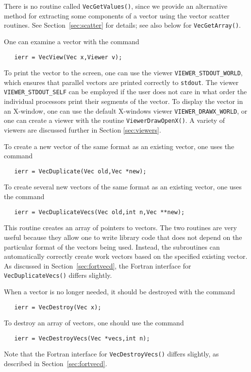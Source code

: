 There is no routine called {\tt VecGetValues()}, since we provide 
an alternative method for extracting some components of a vector using
the vector scatter routines.  See Section~\ref{sec:scatter} for details; see also
below for {\tt VecGetArray()}.

One can examine a vector with the command 
\begin{verbatim}
   ierr = VecView(Vec x,Viewer v);
\end{verbatim}
To print the vector to the screen, one can use the viewer
 {\tt VIEWER\_STDOUT\_WORLD}, which ensures
that parallel vectors are printed correctly to {\tt stdout}.  The
viewer {\tt VIEWER\_STDOUT\_SELF}  
can be employed if
the user does not care in what order the individual processors print
their segments of the vector.  To display the vector in an X-window,
one can use the default X-windows viewer {\tt VIEWER\_DRAWX\_WORLD},
or one can create a viewer with the routine {\tt ViewerDrawOpenX()}.
A variety of viewers are discussed further in Section \ref{sec:viewers}.

To create a new vector of the same format as an existing vector, one uses
the command 
\begin{verbatim}
   ierr = VecDuplicate(Vec old,Vec *new);
\end{verbatim}
To create several new vectors of the same format as an existing vector,
one uses the command 
\begin{verbatim}
   ierr = VecDuplicateVecs(Vec old,int n,Vec **new);
\end{verbatim}
This routine creates an array of pointers to vectors. The two routines 
are very useful because they allow one to write library code that does 
not depend on the particular format of the vectors being used. Instead,
the subroutines can automatically correctly create work vectors
based on the specified existing vector.  As discussed in 
Section~\ref{sec:fortvecd}, the Fortran interface for {\tt VecDuplicateVecs()}
differs slightly.

When a vector is no longer needed, it should be destroyed with the 
command 
\begin{verbatim}
   ierr = VecDestroy(Vec x);
\end{verbatim}
To destroy an array of vectors, one should use the command 
\begin{verbatim}
   ierr = VecDestroyVecs(Vec *vecs,int n);
\end{verbatim}
Note that the Fortran interface for {\tt VecDestroyVecs()} differs slightly,
as described in Section~\ref{sec:fortvecd}.

